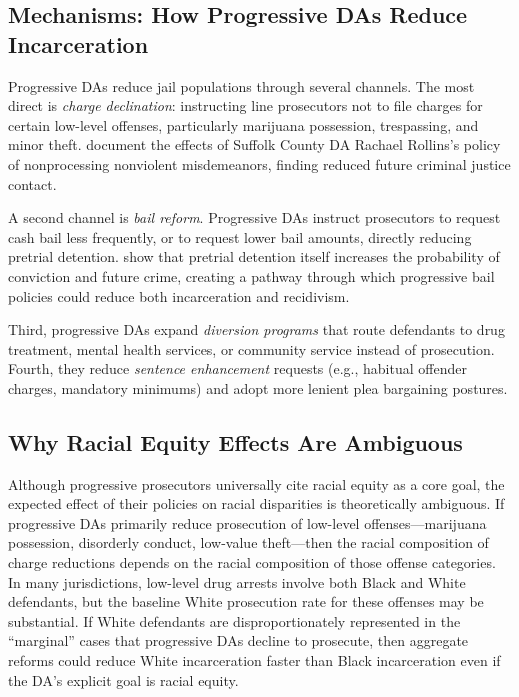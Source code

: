 \documentclass[12pt]{article}
\begin{document}
\subsection{Mechanisms: How Progressive DAs Reduce Incarceration}

Progressive DAs reduce jail populations through several channels. The most direct is \textit{charge declination}: instructing line prosecutors not to file charges for certain low-level offenses, particularly marijuana possession, trespassing, and minor theft. \citet{agan2023misdemeanor} document the effects of Suffolk County DA Rachael Rollins's policy of nonprocessing nonviolent misdemeanors, finding reduced future criminal justice contact.

A second channel is \textit{bail reform}. Progressive DAs instruct prosecutors to request cash bail less frequently, or to request lower bail amounts, directly reducing pretrial detention. \citet{dobbie2018effects} show that pretrial detention itself increases the probability of conviction and future crime, creating a pathway through which progressive bail policies could reduce both incarceration and recidivism.

Third, progressive DAs expand \textit{diversion programs} that route defendants to drug treatment, mental health services, or community service instead of prosecution. Fourth, they reduce \textit{sentence enhancement} requests (e.g., habitual offender charges, mandatory minimums) and adopt more lenient plea bargaining postures.

\subsection{Why Racial Equity Effects Are Ambiguous}

Although progressive prosecutors universally cite racial equity as a core goal, the expected effect of their policies on racial disparities is theoretically ambiguous. If progressive DAs primarily reduce prosecution of low-level offenses---marijuana possession, disorderly conduct, low-value theft---then the racial composition of charge reductions depends on the racial composition of those offense categories. In many jurisdictions, low-level drug arrests involve both Black and White defendants, but the baseline White prosecution rate for these offenses may be substantial. If White defendants are disproportionately represented in the ``marginal'' cases that progressive DAs decline to prosecute, then aggregate reforms could reduce White incarceration faster than Black incarceration even if the DA's explicit goal is racial equity.
\end{document}
